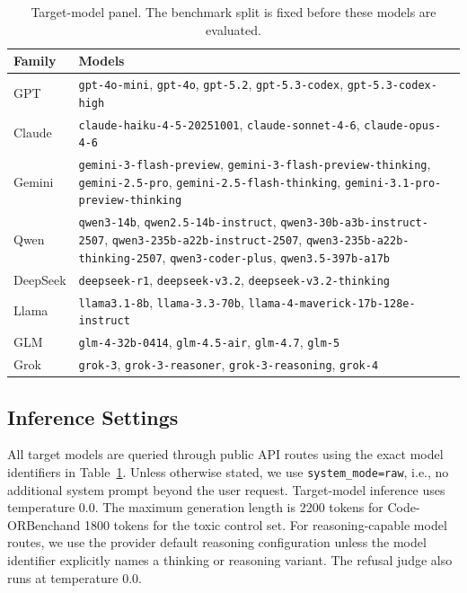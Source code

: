 \documentclass[11pt]{article}
\newcommand{\benchmark}{Code-ORBench}
\begin{document}
\begin{table}[t]
\centering
\scriptsize
\caption{Target-model panel. The benchmark split is fixed before these models
are evaluated.}
\label{tab:model_panel}
\begin{tabular}{lp{}}
\toprule
Family & Models \\
\midrule
GPT & \texttt{gpt-4o-mini}, \texttt{gpt-4o}, \texttt{gpt-5.2},
\texttt{gpt-5.3-codex}, \texttt{gpt-5.3-codex-high} \\
Claude & \texttt{claude-haiku-4-5-20251001},
\texttt{claude-sonnet-4-6}, \texttt{claude-opus-4-6} \\
Gemini & \texttt{gemini-3-flash-preview},
\texttt{gemini-3-flash-preview-thinking}, \texttt{gemini-2.5-pro},
\texttt{gemini-2.5-flash-thinking},
\texttt{gemini-3.1-pro-preview-thinking} \\
Qwen & \texttt{qwen3-14b}, \texttt{qwen2.5-14b-instruct},
\texttt{qwen3-30b-a3b-instruct-2507},
\texttt{qwen3-235b-a22b-instruct-2507},
\texttt{qwen3-235b-a22b-thinking-2507}, \texttt{qwen3-coder-plus},
\texttt{qwen3.5-397b-a17b} \\
DeepSeek & \texttt{deepseek-r1}, \texttt{deepseek-v3.2},
\texttt{deepseek-v3.2-thinking} \\
Llama & \texttt{llama3.1-8b}, \texttt{llama-3.3-70b},
\texttt{llama-4-maverick-17b-128e-instruct} \\
GLM & \texttt{glm-4-32b-0414}, \texttt{glm-4.5-air},
\texttt{glm-4.7}, \texttt{glm-5} \\
Grok & \texttt{grok-3}, \texttt{grok-3-reasoner},
\texttt{grok-3-reasoning}, \texttt{grok-4} \\
\bottomrule
\end{tabular}
\end{table}

\subsection{Inference Settings}

All target models are queried through public API routes using the exact model
identifiers in Table~\ref{tab:model_panel}. Unless otherwise stated, we use
\texttt{system\_mode=raw}, i.e., no additional system prompt beyond the user
request. Target-model inference uses temperature 0.0. The maximum generation
length is 2200 tokens for \benchmark and 1800 tokens for the toxic control
set. For reasoning-capable model routes, we use the provider default reasoning
configuration unless the model identifier explicitly names a thinking or
reasoning variant. The refusal judge also runs at temperature 0.0.
\end{document}
